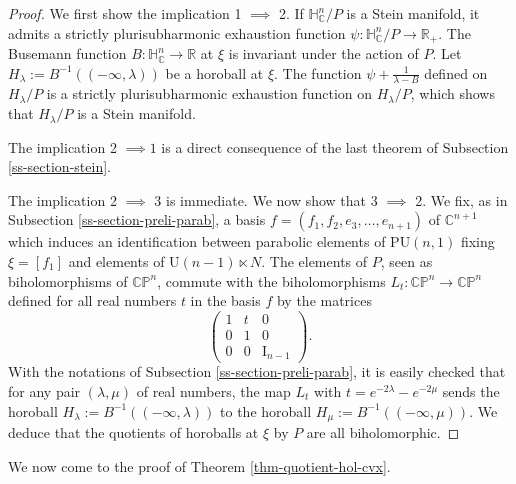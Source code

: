 \documentclass{article}
\theoremstyle{definition}
\theoremstyle{remark}
\newcommand{\C}{\mathbb{C}}
\newcommand{\R}{\mathbb{R}}
\newcommand{\HNC}{\mathbb{H}^{n}_{\C}}
\newcommand{\PU}{\mathrm{PU}}
\newcommand{\PNC}{\C \mathbb{P}^{n}}
\begin{document}
	\begin{proof}
		We first show the implication 1 $\implies$ 2. If $\HNC/P$ is a Stein manifold, it admits a strictly plurisubharmonic exhaustion function $\psi:\HNC/P\to \R_+$. The Busemann function  $B:\HNC\to \R$ at $\xi$ is invariant under the action of $P$. Let $H_{\lambda} := B^{-1}((-\infty,\lambda))$ be a horoball at $\xi$. The function $\psi + \frac{1}{\lambda - B}$ defined on $H_{\lambda}/P$ is a strictly plurisubharmonic exhaustion function on $H_{\lambda}/P$, which shows that $H_{\lambda}/P$ is a Stein manifold.
		
		The implication 2 $\implies 1$ is a direct consequence of the last theorem of Subsection \ref{ss-section-stein}.
		
		The implication 2 $\implies$ 3 is immediate. We now show that 3 $\implies$ 2. We fix, as in Subsection \ref{ss-section-preli-parab}, a basis $f=(f_1,f_2,e_3,\dots,e_{n+1})$ of $\C^{n+1}$ which induces an identification between parabolic elements of $\PU(n,1)$ fixing $\xi=[f_1]$ and elements of $\mathrm{U}(n-1)\ltimes N$. The elements of $P$, seen as biholomorphisms of $\PNC$, commute with the biholomorphisms $L_t:\PNC\to \PNC$ defined for all real numbers $t$ in the basis $f$ by the matrices
		\begin{equation*}
			\left(\begin{matrix}
				1 &t &0\\
				0 &1 &0\\
				0 &0 &\mathrm{I}_{n-1}
			\end{matrix}\right).
		\end{equation*}
		With the notations of Subsection \ref{ss-section-preli-parab}, it is easily checked that for any pair $(\lambda,\mu)$ of real numbers, the map $L_t$ with $t=e^{-2\lambda}-e^{-2\mu}$ sends the horoball $H_{\lambda}:=B^{-1}((-\infty,\lambda))$ to the horoball $H_{\mu}:=B^{-1}((-\infty,\mu))$. We deduce that the quotients of horoballs at $\xi$ by $P$ are all biholomorphic.
	\end{proof}
	
	We now come to the proof of Theorem \ref{thm-quotient-hol-cvx}.
	
\end{document}
